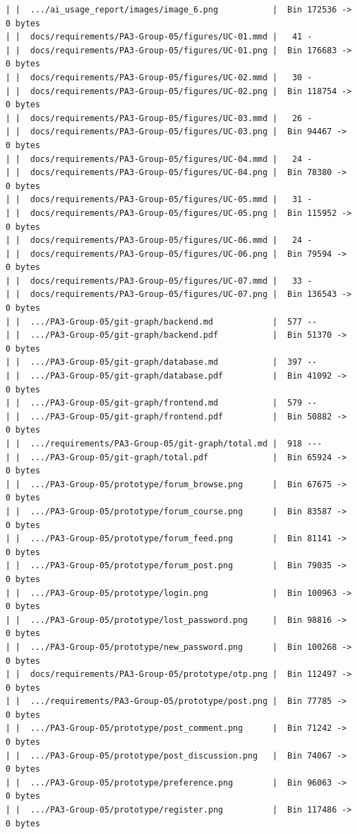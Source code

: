 \documentclass[12pt]{article}
\begin{document}
\begin{lstlisting}[numbers=none,breaklines=true]
| |  .../ai_usage_report/images/image_6.png           |  Bin 172536 -> 0 bytes
| |  docs/requirements/PA3-Group-05/figures/UC-01.mmd |   41 -
| |  docs/requirements/PA3-Group-05/figures/UC-01.png |  Bin 176683 -> 0 bytes
| |  docs/requirements/PA3-Group-05/figures/UC-02.mmd |   30 -
| |  docs/requirements/PA3-Group-05/figures/UC-02.png |  Bin 118754 -> 0 bytes
| |  docs/requirements/PA3-Group-05/figures/UC-03.mmd |   26 -
| |  docs/requirements/PA3-Group-05/figures/UC-03.png |  Bin 94467 -> 0 bytes
| |  docs/requirements/PA3-Group-05/figures/UC-04.mmd |   24 -
| |  docs/requirements/PA3-Group-05/figures/UC-04.png |  Bin 78380 -> 0 bytes
| |  docs/requirements/PA3-Group-05/figures/UC-05.mmd |   31 -
| |  docs/requirements/PA3-Group-05/figures/UC-05.png |  Bin 115952 -> 0 bytes
| |  docs/requirements/PA3-Group-05/figures/UC-06.mmd |   24 -
| |  docs/requirements/PA3-Group-05/figures/UC-06.png |  Bin 79594 -> 0 bytes
| |  docs/requirements/PA3-Group-05/figures/UC-07.mmd |   33 -
| |  docs/requirements/PA3-Group-05/figures/UC-07.png |  Bin 136543 -> 0 bytes
| |  .../PA3-Group-05/git-graph/backend.md            |  577 --
| |  .../PA3-Group-05/git-graph/backend.pdf           |  Bin 51370 -> 0 bytes
| |  .../PA3-Group-05/git-graph/database.md           |  397 --
| |  .../PA3-Group-05/git-graph/database.pdf          |  Bin 41092 -> 0 bytes
| |  .../PA3-Group-05/git-graph/frontend.md           |  579 --
| |  .../PA3-Group-05/git-graph/frontend.pdf          |  Bin 50882 -> 0 bytes
| |  .../requirements/PA3-Group-05/git-graph/total.md |  918 ---
| |  .../PA3-Group-05/git-graph/total.pdf             |  Bin 65924 -> 0 bytes
| |  .../PA3-Group-05/prototype/forum_browse.png      |  Bin 67675 -> 0 bytes
| |  .../PA3-Group-05/prototype/forum_course.png      |  Bin 83587 -> 0 bytes
| |  .../PA3-Group-05/prototype/forum_feed.png        |  Bin 81141 -> 0 bytes
| |  .../PA3-Group-05/prototype/forum_post.png        |  Bin 79035 -> 0 bytes
| |  .../PA3-Group-05/prototype/login.png             |  Bin 100963 -> 0 bytes
| |  .../PA3-Group-05/prototype/lost_password.png     |  Bin 98816 -> 0 bytes
| |  .../PA3-Group-05/prototype/new_password.png      |  Bin 100268 -> 0 bytes
| |  docs/requirements/PA3-Group-05/prototype/otp.png |  Bin 112497 -> 0 bytes
| |  .../requirements/PA3-Group-05/prototype/post.png |  Bin 77785 -> 0 bytes
| |  .../PA3-Group-05/prototype/post_comment.png      |  Bin 71242 -> 0 bytes
| |  .../PA3-Group-05/prototype/post_discussion.png   |  Bin 74067 -> 0 bytes
| |  .../PA3-Group-05/prototype/preference.png        |  Bin 96063 -> 0 bytes
| |  .../PA3-Group-05/prototype/register.png          |  Bin 117486 -> 0 bytes

\end{lstlisting}
\end{document}
